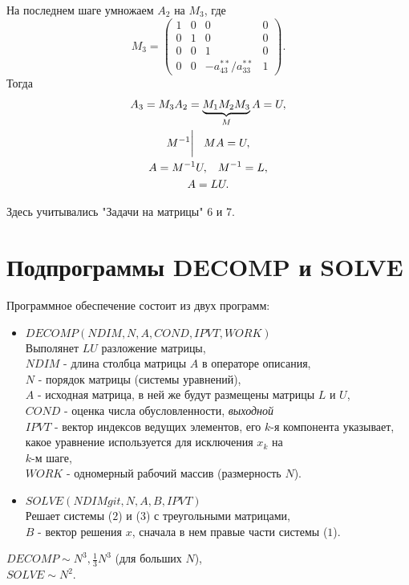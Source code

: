 \documentclass[a4paper,11pt]{article}
\begin{document}
На последнем шаге умножаем $A_2$ на $M_3$, где
\begin{equation*}
  M_3 =
  \begin{pmatrix}
    1 & 0 & 0 & 0 \\
    0 & 1 & 0 & 0 \\
    0 & 0 & 1 & 0 \\
    0 & 0 & -a_{43}^{**}/a_{33}^{**} & 1
  \end{pmatrix}.
\end{equation*}
Тогда
\begin{gather*}
  A_3 = M_3A_2 = \underbrace{M_1M_2M_3}_{M}A = U, \\
  M^{-1} \bigg| \hspace{3mm} MA=U, \\
  A = M^{-1}U, \hspace{3mm} M^{-1} = L, \\
  A = LU.
\end{gather*}
\begin{flushright}
  \footnotesize Здесь учитывались "Задачи на матрицы" 6 и 7.
\end{flushright}

\section{Подпрограммы DECOMP и SOLVE}
Программное обеспечение состоит из двух программ:
\begin{itemize}
  \item $DECOMP(NDIM, N, A, COND, IPVT, WORK)$ \\
    Выполянет $LU$ разложение матрицы, \vspace{2mm} \\
    $NDIM$ - длина столбца матрицы $A$ в операторе описания, \\
    $N$ - порядок матрицы (системы уравнений), \\
    $A$ - исходная матрица, в ней же будут размещены матрицы $L$ и $U$, \\
    $COND$ - оценка числа обусловленности, \textit{выходной}\\
    $IPVT$ - вектор индексов ведущих элементов, его $k$-я компонента указывает, какое уравнение используется для исключения $x_k$ на \\ $k$-м шаге, \\
    $WORK$ - одномерный рабочий массив (размерность $N$).
  \item $SOLVE(NDIMgit , N, A, B, IPVT)$ \\
    Решает системы ($2$) и ($3$) с треугольными матрицами, \\
    $B$ - вектор решения $x$, сначала в нем правые части системы ($1$).
\end{itemize}
\begin{flushright}
  \small
  $DECOMP \sim N^3, \frac{1}{3}N^3$ (для больших $N$), \\
  $SOLVE \sim N^2$.
\end{flushright}
\end{document}
